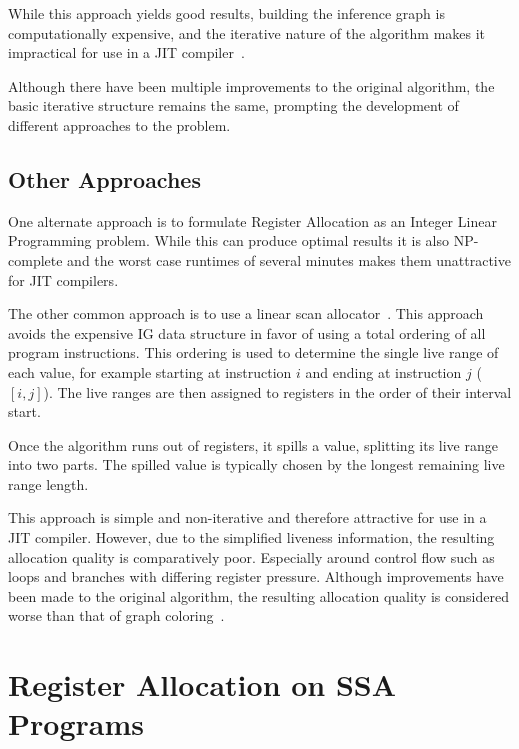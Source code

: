 While this approach yields good results, building the inference graph is computationally expensive, and the iterative nature of the algorithm makes it impractical for use in a JIT compiler~\cite{Cooper06}. 

Although there have been multiple improvements to the original algorithm, the basic iterative structure remains the same, prompting the development of different approaches to the problem.

\subsection{Other Approaches}

One alternate approach is to formulate Register Allocation as an Integer Linear Programming problem. While this can produce optimal results it is also NP-complete and the worst case runtimes of several minutes makes them unattractive for JIT compilers\cite{ilp-regalloc}.

The other common approach is to use a linear scan allocator~\cite{linear-scan-og}. This approach avoids the expensive IG data structure in favor of using a total ordering of all program instructions. This ordering is used to determine the single live range of each value, for example starting at instruction $i$ and ending at instruction $j$ ($[i,j]$). The live ranges are then assigned to registers in the order of their interval start. 

Once the algorithm runs out of registers, it spills a value, splitting its live range into two parts. The spilled value is typically chosen by the longest remaining live range length.

This approach is simple and non-iterative and therefore attractive for use in a JIT compiler. However, due to the simplified liveness information, the resulting allocation quality is comparatively poor. Especially around control flow such as loops and branches with differing register pressure. Although improvements have been made to the original algorithm, the resulting allocation quality is considered worse than that of graph coloring~\cite{wimmer-06-linear-scan}.

\section{Register Allocation on SSA Programs}



